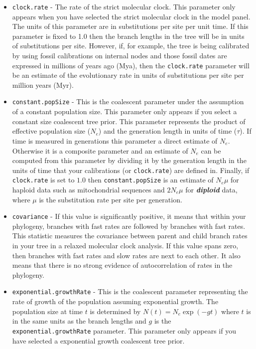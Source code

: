 \documentclass[cup7b, english]{cupbook}
\begin{document}
\begin{boxedminipage}{\textwidth}
{\scriptsize
\begin{itemize}
\item \texttt{clock.rate} - The rate of the strict molecular clock. This parameter only appears when you have
selected the strict molecular clock in the model panel. The units of this parameter are in substitutions per site per
unit time. If this parameter is fixed to 1.0 then
the branch lengths in the tree will be in units of substitutions per site. However, if, for example, the tree is being
calibrated by using fossil calibrations on internal nodes and those fossil dates are expressed in millions of years ago
(Mya), then the \texttt{clock.rate} parameter will be an estimate of the evolutionary rate in units of substitutions
per site per million years (Myr).

\item \texttt{constant.popSize} - This is the coalescent parameter under the assumption of a constant population
size. This parameter only appears if you select a constant size coalescent tree prior. This parameter represents the
product of effective population size ($N_e$) and the generation length in units of time ($\tau$). If time is measured in
generations this parameter a direct estimate of $N_e$. Otherwise it is a composite parameter and an estimate of $N_e$
can be computed from this parameter by dividing it by the generation length in the units of time that your calibrations
(or \texttt{clock.rate}) are defined in. Finally,  if \texttt{clock.rate} is set to $1.0$ then \texttt{constant.popSize} is an
estimate of $N_e\mu$ for haploid data such as mitochondrial sequences and $2N_e\mu$ for \textbf{\textit{diploid}} data, where $\mu$ is the
substitution rate per site per generation.

\item \texttt{covariance} - If this value is significantly positive, it means that within your phylogeny,
branches with fast rates are followed by branches with fast rates. This statistic measures the covariance between parent
and child branch rates in your tree in a relaxed molecular clock analysis. If this value spans zero, then branches with
fast rates and slow rates are next to each other.  It also means that there is no strong evidence of autocorrelation
of rates in the phylogeny.

\item \texttt{exponential.growthRate} -	 This is the coalescent parameter representing the rate of growth of the
population assuming exponential growth. The population size at time $t$ is determined by $N(t)=N_e\exp(-gt)$ where $t$
is in the same units as the branch lengths and $g$ is the \texttt{exponential.growthRate} parameter. This parameter only
appears if you have selected a exponential growth coalescent tree prior.


\end{itemize}}
\end{boxedminipage}
\end{document}
